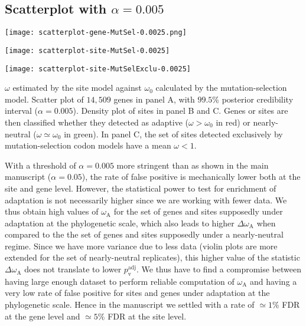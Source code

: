 \documentclass{article}
\renewcommand*{\bm}[1]{#1}%
\newcommand{\rateApop}{\omega_{\mathrm{A}}}
\begin{document}
    \subsection{Scatterplot with $\bm{\alpha=0.005}$}

    \begin{center}
        \begin{minipage}{0.32\linewidth}
            \texttt{[image: scatterplot-gene-MutSel-0.0025.png]}
        \end{minipage}
        \hfill
        \begin{minipage}{0.32\linewidth}
            \texttt{[image: scatterplot-site-MutSel-0.0025]}
        \end{minipage}
        \hfill
        \begin{minipage}{0.32\linewidth}
            \texttt{[image: scatterplot-site-MutSelExclu-0.0025]}
        \end{minipage}
        \hfill
    \end{center}

    $\omega$ estimated by the site model against $\omega_{0}$ calculated by the mutation-selection model.
    Scatter plot of $14,509$ genes in panel A, with $99.5$\% posterior credibility interval ($\alpha=0.005$).
    Density plot of sites in panel B and C.
    Genes or sites are then classified whether they detected as adaptive ($\omega > \omega_{0}$ in red) or nearly-neutral ($\omega \simeq \omega_{0}$ in green).
    In panel C, the set of sites detected exclusively by mutation-selection codon models have a mean $\omega < 1 $.

    \newpage
    

    With a threshold of $\alpha=0.005$ more stringent than as shown in the main manuscript ($\alpha=0.05$), the rate of false positive is mechanically lower both at the site and gene level.
    However, the statistical power to test for enrichment of adaptation is not necessarily higher since we are working with fewer data.
    We thus obtain high values of $\rateApop$ for the set of genes and sites supposedly under adaptation at the phylogenetic scale, which also leads to higher $\Delta \rateApop$ when compared to the the set of genes and sites supposedly under a nearly-neutral regime.
    Since we have more variance due to less data (violin plots are more extended for the set of nearly-neutral replicates), this higher value of the statistic $\Delta \rateApop$
    does not translate to lower $p_{\mathrm{v}}^{\mathrm{adj}}$.
    We thus have to find a compromise between having large enough dataset to perform reliable computation of $\rateApop$ and having a very low rate of false positive for sites and genes under adaptation at the phylogenetic scale.
    Hence in the manuscript we settled with a rate of $\simeq 1 \%$ FDR at the gene level and $\simeq 5 \%$ FDR at the site level.
\end{document}
